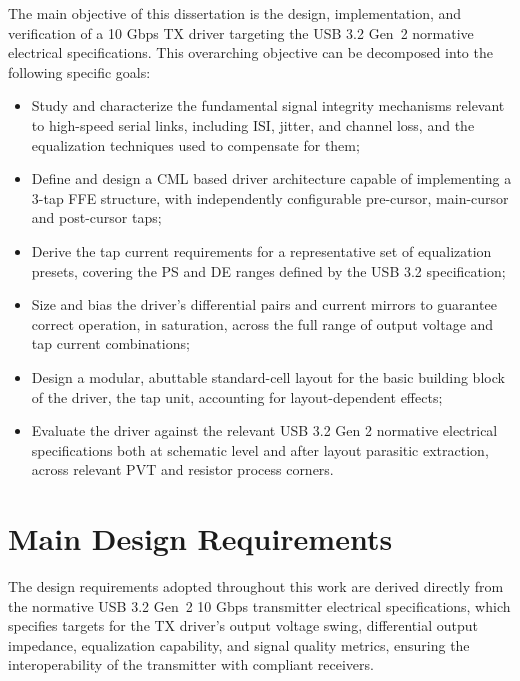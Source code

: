 The main objective of this dissertation is the design, implementation, and verification of a 10 Gbps \ac{TX} driver targeting the \ac{USB} 3.2 Gen~2 normative electrical specifications. This overarching objective can be decomposed into the following specific goals:

\begin{itemize}
 \item Study and characterize the fundamental signal integrity mechanisms relevant to high-speed serial links, including \ac{ISI}, jitter, and channel loss, and the equalization techniques used to compensate for them;
 \item Define and design a \ac{CML} based driver architecture capable of implementing a 3-tap \ac{FFE} structure, with independently configurable pre-cursor, main-cursor and post-cursor taps;
 \item Derive the tap current requirements for a representative set of equalization presets, covering the \ac{PS} and \ac{DE} ranges defined by the \ac{USB} 3.2 specification;
 \item Size and bias the driver's differential pairs and current mirrors to guarantee correct operation, in saturation, across the full range of output voltage and tap current combinations;
 \item Design a modular, abuttable standard-cell layout for the basic building block of the driver, the tap unit, accounting for layout-dependent effects;
 \item Evaluate the driver against the relevant USB 3.2 Gen 2 normative electrical specifications both at schematic level and after layout parasitic extraction, across relevant PVT and resistor process corners.
\end{itemize}

\section{Main Design Requirements}

The design requirements adopted throughout this work are derived directly from the normative \ac{USB} 3.2 Gen~2 10 Gbps transmitter electrical specifications, which specifies targets for the \ac{TX} driver's output voltage swing, differential output impedance, equalization capability, and signal quality metrics, ensuring the interoperability of the transmitter with compliant receivers. 


